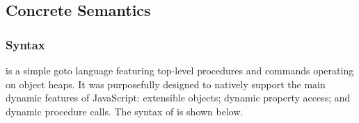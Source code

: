 

\subsection{Concrete Semantics}\label{subsec:jsil:analysis:formalism}
 
\subsubsection{Syntax} 
\jsil is a simple goto language featuring top-level procedures and commands operating on object heaps. It was purposefully designed to natively support the main dynamic features of JavaScript: extensible objects; dynamic property access; and dynamic procedure calls. The syntax of \jsil is shown below. 

